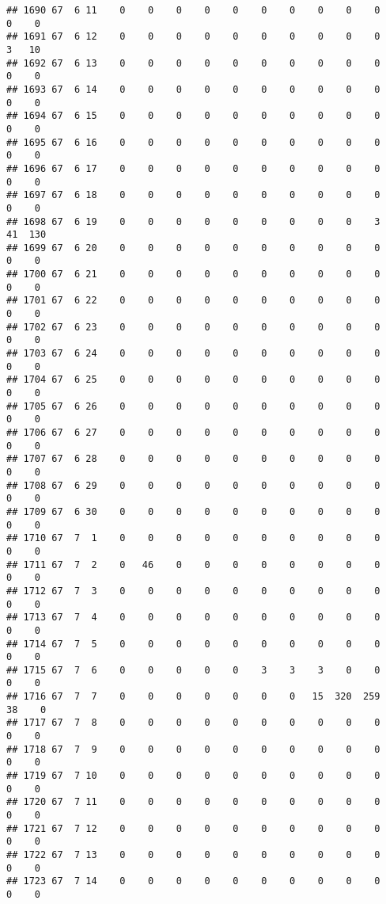 \documentclass[]{article}
\begin{document}
\begin{verbatim}
## 1690 67  6 11    0    0    0    0    0    0    0    0    0    0    0    0
## 1691 67  6 12    0    0    0    0    0    0    0    0    0    0    3   10
## 1692 67  6 13    0    0    0    0    0    0    0    0    0    0    0    0
## 1693 67  6 14    0    0    0    0    0    0    0    0    0    0    0    0
## 1694 67  6 15    0    0    0    0    0    0    0    0    0    0    0    0
## 1695 67  6 16    0    0    0    0    0    0    0    0    0    0    0    0
## 1696 67  6 17    0    0    0    0    0    0    0    0    0    0    0    0
## 1697 67  6 18    0    0    0    0    0    0    0    0    0    0    0    0
## 1698 67  6 19    0    0    0    0    0    0    0    0    0    3   41  130
## 1699 67  6 20    0    0    0    0    0    0    0    0    0    0    0    0
## 1700 67  6 21    0    0    0    0    0    0    0    0    0    0    0    0
## 1701 67  6 22    0    0    0    0    0    0    0    0    0    0    0    0
## 1702 67  6 23    0    0    0    0    0    0    0    0    0    0    0    0
## 1703 67  6 24    0    0    0    0    0    0    0    0    0    0    0    0
## 1704 67  6 25    0    0    0    0    0    0    0    0    0    0    0    0
## 1705 67  6 26    0    0    0    0    0    0    0    0    0    0    0    0
## 1706 67  6 27    0    0    0    0    0    0    0    0    0    0    0    0
## 1707 67  6 28    0    0    0    0    0    0    0    0    0    0    0    0
## 1708 67  6 29    0    0    0    0    0    0    0    0    0    0    0    0
## 1709 67  6 30    0    0    0    0    0    0    0    0    0    0    0    0
## 1710 67  7  1    0    0    0    0    0    0    0    0    0    0    0    0
## 1711 67  7  2    0   46    0    0    0    0    0    0    0    0    0    0
## 1712 67  7  3    0    0    0    0    0    0    0    0    0    0    0    0
## 1713 67  7  4    0    0    0    0    0    0    0    0    0    0    0    0
## 1714 67  7  5    0    0    0    0    0    0    0    0    0    0    0    0
## 1715 67  7  6    0    0    0    0    0    3    3    3    0    0    0    0
## 1716 67  7  7    0    0    0    0    0    0    0   15  320  259   38    0
## 1717 67  7  8    0    0    0    0    0    0    0    0    0    0    0    0
## 1718 67  7  9    0    0    0    0    0    0    0    0    0    0    0    0
## 1719 67  7 10    0    0    0    0    0    0    0    0    0    0    0    0
## 1720 67  7 11    0    0    0    0    0    0    0    0    0    0    0    0
## 1721 67  7 12    0    0    0    0    0    0    0    0    0    0    0    0
## 1722 67  7 13    0    0    0    0    0    0    0    0    0    0    0    0
## 1723 67  7 14    0    0    0    0    0    0    0    0    0    0    0    0

\end{verbatim}
\end{document}
